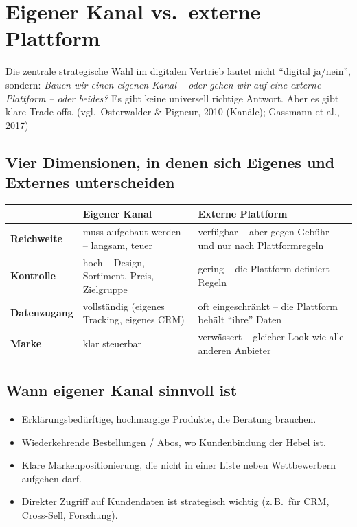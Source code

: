 \documentclass[11pt,a4paper,oneside]{article}
\newcommand{\quelle}[1]{{\footnotesize\color{lpGray}(#1)}}
\begin{document}
\section{Eigener Kanal vs.\ externe Plattform}

Die zentrale strategische Wahl im digitalen Vertrieb lautet nicht ``digital ja/nein'', sondern: \emph{Bauen wir einen eigenen Kanal -- oder gehen wir auf eine externe Plattform -- oder beides?} Es gibt keine universell richtige Antwort. Aber es gibt klare Trade-offs. \quelle{vgl.\ Osterwalder \& Pigneur, 2010 (Kanäle); Gassmann et al., 2017}

\subsection{Vier Dimensionen, in denen sich Eigenes und Externes unterscheiden}

\begin{tabularx}{\linewidth}{@{}l X X@{}}
\toprule
& \textbf{Eigener Kanal} & \textbf{Externe Plattform} \\
\midrule
\textbf{Reichweite} & muss aufgebaut werden -- langsam, teuer & verfügbar -- aber gegen Gebühr und nur nach Plattformregeln \\
\textbf{Kontrolle} & hoch -- Design, Sortiment, Preis, Zielgruppe & gering -- die Plattform definiert Regeln \\
\textbf{Datenzugang} & vollständig (eigenes Tracking, eigenes CRM) & oft eingeschränkt -- die Plattform behält ``ihre'' Daten \\
\textbf{Marke} & klar steuerbar & verwässert -- gleicher Look wie alle anderen Anbieter \\
\bottomrule
\end{tabularx}

\subsection{Wann eigener Kanal sinnvoll ist}

\begin{itemize}
  \item Erklärungsbedürftige, hochmargige Produkte, die Beratung brauchen.
  \item Wiederkehrende Bestellungen / Abos, wo Kundenbindung der Hebel ist.
  \item Klare Markenpositionierung, die nicht in einer Liste neben Wettbewerbern aufgehen darf.
  \item Direkter Zugriff auf Kundendaten ist strategisch wichtig (z.\,B.\ für CRM, Cross-Sell, Forschung).
\end{itemize}
\end{document}
